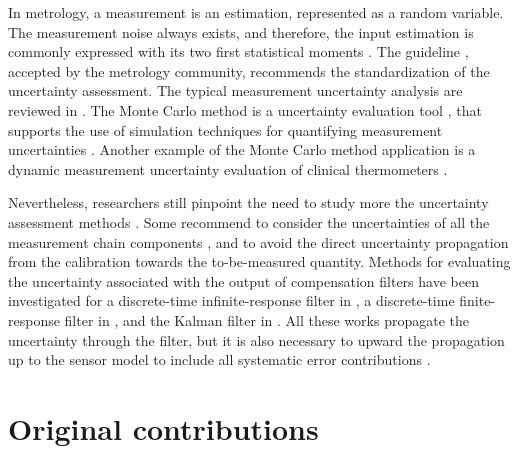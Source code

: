In metrology, a measurement is an estimation, represented as a random variable.
The measurement noise always exists, and therefore, the input estimation is commonly expressed with its two first statistical moments \citep{Ferrero06}.
The guideline \citep{GUM08}, accepted by the metrology community, recommends the standardization of the uncertainty assessment.
The typical measurement uncertainty analysis are reviewed in \citep{daSilva12}.
The Monte Carlo method is a uncertainty evaluation tool \citep{Cox06},
that supports the use of simulation techniques for quantifying measurement uncertainties \citep{Esward16}.
Another example of the Monte Carlo method application is a dynamic measurement uncertainty evaluation of clinical thermometers \citep{Ogorevc16}.

Nevertheless, researchers still pinpoint the need to study more the uncertainty assessment methods \citep{Esward09, Hessling10}.
Some recommend to consider the uncertainties of all the measurement chain components \citep{Diniz17}, and to avoid the direct uncertainty propagation from the calibration towards the to-be-measured quantity.  
Methods for evaluating the uncertainty associated with the output of compensation filters have been investigated for
a discrete-time infinite-response filter in \citep{Link09},
a discrete-time finite-response filter in \citep{Elster07, Elster08}, and
the Kalman filter in \citep{Eichstadt16b}.
All these works propagate the uncertainty through the filter, but it is also necessary to upward the propagation up to the sensor model to include all systematic error contributions \citep{Hessling11}.



\section{Original contributions}


